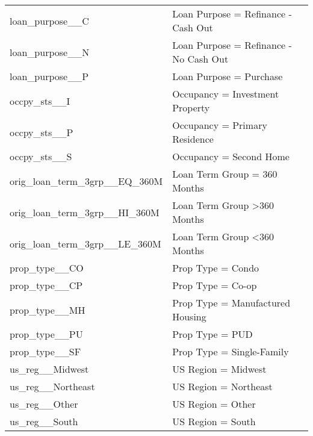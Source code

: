 \begin{longtable}{lp{8cm}}
loan\_purpose\_\_C                 & Loan Purpose = Refinance - Cash Out                                  \\
loan\_purpose\_\_N                 & Loan Purpose = Refinance - No Cash Out                               \\
loan\_purpose\_\_P                 & Loan Purpose = Purchase                                              \\\hline
occpy\_sts\_\_I                    & Occupancy = Investment Property                                      \\
occpy\_sts\_\_P                    & Occupancy = Primary Residence                                        \\
occpy\_sts\_\_S                    & Occupancy = Second Home                                              \\\hline
orig\_loan\_term\_3grp\_\_EQ\_360M & Loan Term Group = 360 Months                                         \\
orig\_loan\_term\_3grp\_\_HI\_360M & Loan Term Group \textgreater 360 Months                              \\
orig\_loan\_term\_3grp\_\_LE\_360M & Loan Term Group \textless 360 Months                                 \\\hline
prop\_type\_\_CO                   & Prop Type = Condo                                                    \\
prop\_type\_\_CP                   & Prop Type = Co-op                                                    \\
prop\_type\_\_MH                   & Prop Type = Manufactured Housing                                     \\
prop\_type\_\_PU                   & Prop Type = PUD                                                      \\
prop\_type\_\_SF                   & Prop Type = Single-Family                                            \\\hline
us\_reg\_\_Midwest                 & US Region = Midwest                                                  \\
us\_reg\_\_Northeast               & US Region = Northeast                                                \\
us\_reg\_\_Other                   & US Region = Other                                                    \\
us\_reg\_\_South                   & US Region = South                                                    \\

\end{longtable}
